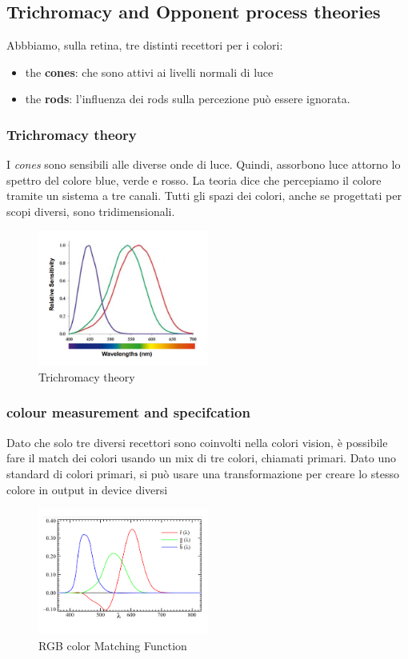 \subsection{Trichromacy and Opponent process theories}
Abbbiamo, sulla retina, tre distinti recettori per i colori:
\begin{itemize}
    \item the \textbf{cones}: che sono attivi ai livelli normali di luce
    \item the \textbf{rods}: l'influenza dei rods sulla percezione può essere ignorata.
\end{itemize}
\subsubsection{Trichromacy theory}
I \textit{cones} sono sensibili alle diverse onde di luce.
Quindi, assorbono luce attorno lo spettro del colore blue, verde e rosso.
La teoria dice che percepiamo il colore tramite un sistema a tre canali.
Tutti gli spazi dei colori, anche se progettati per scopi diversi, sono tridimensionali.
\begin{figure}[H]
    \centering
    \includegraphics[width=0.5\textwidth]{images/Thrichromacy.png} 
    \caption{Trichromacy theory}
    \label{fig:immagine}
\end{figure}
\subsubsection{colour measurement and specifcation}
Dato che solo tre diversi recettori sono coinvolti nella colori vision, è possibile fare il match dei colori
usando un mix di tre colori, chiamati primari.
Dato uno standard di colori primari, si può usare una transformazione per creare lo stesso colore in output in device diversi 
\begin{figure}[H]
    \centering
    \includegraphics[width=0.5\textwidth]{images/RGB.png} 
    \caption{RGB color Matching Function}
    \label{fig:immagine}
\end{figure}
